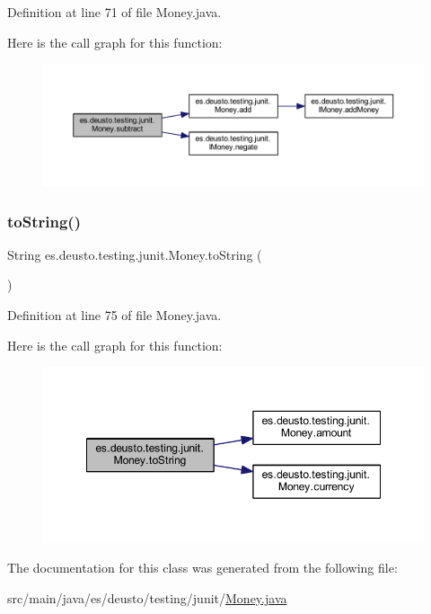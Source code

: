 Definition at line 71 of file Money.\+java.

Here is the call graph for this function\+:\nopagebreak
\begin{figure}[H]
\begin{center}
\leavevmode
\includegraphics[width=350pt]{classes_1_1deusto_1_1testing_1_1junit_1_1_money_aada973cd1a31410ed2b7e5d2ae6bc2e9_cgraph}
\end{center}
\end{figure}
\mbox{\label{classes_1_1deusto_1_1testing_1_1junit_1_1_money_af9e655069123757bea0efecc4efcd638}} 
\subsubsection{\texorpdfstring{to\+String()}{toString()}}
{\footnotesize\ttfamily String es.\+deusto.\+testing.\+junit.\+Money.\+to\+String (\begin{DoxyParamCaption}{ }\end{DoxyParamCaption})}



Definition at line 75 of file Money.\+java.

Here is the call graph for this function\+:\nopagebreak
\begin{figure}[H]
\begin{center}
\leavevmode
\includegraphics[width=348pt]{classes_1_1deusto_1_1testing_1_1junit_1_1_money_af9e655069123757bea0efecc4efcd638_cgraph}
\end{center}
\end{figure}


The documentation for this class was generated from the following file\+:\begin{DoxyCompactItemize}
\item 
src/main/java/es/deusto/testing/junit/\mbox{\hyperlink{_money_8java}{Money.\+java}}\end{DoxyCompactItemize}
